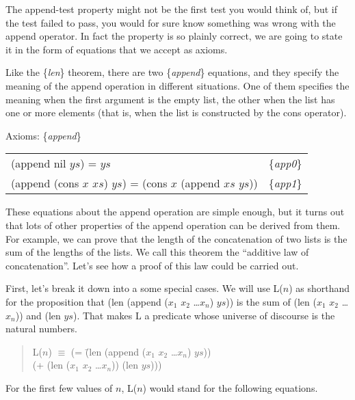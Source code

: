 The append-test property might not be the first test you would think of, 
but if the test failed to pass, 
you would for sure know something was wrong with the append operator. 
In fact the property is so plainly correct, 
we are going to state it in the form of equations that we accept as axioms.

Like the \{\emph{len}\} theorem, there are two \{\emph{append}\} equations, 
and they specify the meaning of the append operation in different situations. 
One of them specifies the meaning when the first argument is the empty list,
the other when the list has one or more elements 
(that is, when the list is constructed by the cons operator).

\begin{center}
\label{append-equations}
Axioms: \{\emph{append}\} \\
\begin{tabular}{ll}
(append nil $ys$) =  $ys$                                     & \{\emph{app0}\} \\
(append (cons $x$ $xs$) $ys$) = (cons $x$ (append $xs$ $ys$)) & \{\emph{app1}\} \\
\end{tabular}
\end{center}

These equations about the append operation are simple enough, 
but it turns out that lots of other properties of the 
append operation can be derived from them. 
For example, we can prove that the length of 
the concatenation of two lists is the sum of the lengths of the lists. 
We call this theorem the ``additive law of concatenation''. 
Let's see how a proof of this law could be carried out.

First, let's break it down into a some special cases. 
We will use L($n$) as shorthand for the proposition that 
(len (append ($x_1$ $x_2$ \dots $x_n$) $ys$)) 
is the sum of (len ($x_1$ $x_2$ \dots $x_n$)) and (len $ys$).
That makes L a predicate whose universe of discourse is
the natural numbers.

\begin{quote}
\begin{tabbing}
L($n$) $\equiv$ (= \=(len (append ($x_1$ $x_2$ \dots $x_n$) $ys$))  \\
                   \>(+ (len ($x_1$ $x_2$ \dots $x_n$)) (len $ys$)))
\end{tabbing}
\label{additive-concat-law-predicate}
\end{quote}

For the first few values of $n$, L($n$) would stand for the following equations.


